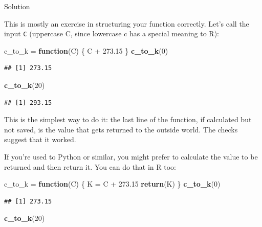 \documentclass[]{tufte-book}
\newenvironment{Shaded}{}{}
\newcommand{\ControlFlowTok}[1]{\textcolor[rgb]{0.00,0.44,0.13}{\textbf{#1}}}
\newcommand{\DecValTok}[1]{\textcolor[rgb]{0.25,0.63,0.44}{#1}}
\newcommand{\FloatTok}[1]{\textcolor[rgb]{0.25,0.63,0.44}{#1}}
\newcommand{\KeywordTok}[1]{\textcolor[rgb]{0.00,0.44,0.13}{\textbf{#1}}}
\newcommand{\NormalTok}[1]{#1}
\newcommand{\OperatorTok}[1]{\textcolor[rgb]{0.40,0.40,0.40}{#1}}
\newcommand{\StringTok}[1]{\textcolor[rgb]{0.25,0.44,0.63}{#1}}
\theoremstyle{definition}
\theoremstyle{definition}
\theoremstyle{definition}
\theoremstyle{remark}
\begin{document}
Solution

This is mostly an exercise in structuring your function correctly. Let's
call the input \texttt{C} (uppercase C, since lowercase c has a special
meaning to R):

\begin{Shaded}
\begin{Highlighting}[]
\NormalTok{c_to_k =}\StringTok{ }\ControlFlowTok{function}\NormalTok{(C) \{}
\NormalTok{    C }\OperatorTok{+}\StringTok{ }\FloatTok{273.15}
\NormalTok{\}}
\KeywordTok{c_to_k}\NormalTok{(}\DecValTok{0}\NormalTok{)}
\end{Highlighting}
\end{Shaded}

\begin{verbatim}
## [1] 273.15
\end{verbatim}

\begin{Shaded}
\begin{Highlighting}[]
\KeywordTok{c_to_k}\NormalTok{(}\DecValTok{20}\NormalTok{)}
\end{Highlighting}
\end{Shaded}

\begin{verbatim}
## [1] 293.15
\end{verbatim}

This is the simplest way to do it: the last line of the function, if
calculated but not saved, is the value that gets returned to the outside
world. The checks suggest that it worked.

If you're used to Python or similar, you might prefer to calculate the
value to be returned and then return it. You can do that in R too:

\begin{Shaded}
\begin{Highlighting}[]
\NormalTok{c_to_k =}\StringTok{ }\ControlFlowTok{function}\NormalTok{(C) \{}
\NormalTok{    K =}\StringTok{ }\NormalTok{C }\OperatorTok{+}\StringTok{ }\FloatTok{273.15}
    \KeywordTok{return}\NormalTok{(K)}
\NormalTok{\}}
\KeywordTok{c_to_k}\NormalTok{(}\DecValTok{0}\NormalTok{)}
\end{Highlighting}
\end{Shaded}

\begin{verbatim}
## [1] 273.15
\end{verbatim}

\begin{Shaded}
\begin{Highlighting}[]
\KeywordTok{c_to_k}\NormalTok{(}\DecValTok{20}\NormalTok{)}
\end{Highlighting}
\end{Shaded}
\end{document}
